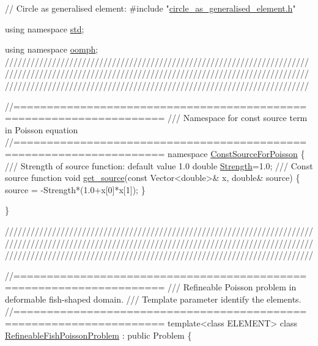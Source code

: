 \begin{DoxyCodeInclude}
\textcolor{comment}{// Circle as generalised element:}
\textcolor{preprocessor}{#include "\hyperlink{circle__as__generalised__element_8h}{circle\_as\_generalised\_element.h}"}

\textcolor{keyword}{using namespace }\hyperlink{namespacestd}{std};

\textcolor{keyword}{using namespace }\hyperlink{namespaceoomph}{oomph};
\textcolor{comment}{}
\textcolor{comment}{///////////////////////////////////////////////////////////////////////}
\textcolor{comment}{///////////////////////////////////////////////////////////////////////}
\textcolor{comment}{///////////////////////////////////////////////////////////////////////}
\textcolor{comment}{}


\textcolor{comment}{//====================================================================}\textcolor{comment}{}
\textcolor{comment}{/// Namespace for const source term in Poisson equation}
\textcolor{comment}{}\textcolor{comment}{//====================================================================}
\textcolor{keyword}{namespace }\hyperlink{namespaceConstSourceForPoisson}{ConstSourceForPoisson}
\{\textcolor{comment}{}
\textcolor{comment}{ /// Strength of source function: default value 1.0}
\textcolor{comment}{} \textcolor{keywordtype}{double} \hyperlink{namespaceConstSourceForPoisson_add351c5acab2561d68d1fc9ec3d5fc5e}{Strength}=1.0;
\textcolor{comment}{}
\textcolor{comment}{/// Const source function}
\textcolor{comment}{} \textcolor{keywordtype}{void} \hyperlink{namespaceConstSourceForPoisson_a40ef79083874b58ed42b4df2ca0f4c10}{get\_source}(\textcolor{keyword}{const} Vector<double>& x, \textcolor{keywordtype}{double}& source)
 \{
  source = -Strength*(1.0+x[0]*x[1]);
 \}
 
\}

\textcolor{comment}{}
\textcolor{comment}{////////////////////////////////////////////////////////////////////////}
\textcolor{comment}{////////////////////////////////////////////////////////////////////////}
\textcolor{comment}{////////////////////////////////////////////////////////////////////////}
\textcolor{comment}{}


\textcolor{comment}{//====================================================================}\textcolor{comment}{}
\textcolor{comment}{/// Refineable Poisson problem in deformable fish-shaped domain.}
\textcolor{comment}{/// Template parameter identify the elements.}
\textcolor{comment}{}\textcolor{comment}{//====================================================================}
\textcolor{keyword}{template}<\textcolor{keyword}{class} ELEMENT>
\textcolor{keyword}{class }\hyperlink{classRefineableFishPoissonProblem}{RefineableFishPoissonProblem} : \textcolor{keyword}{public} Problem
\{


\end{DoxyCodeInclude}
